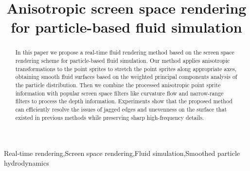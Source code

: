 \documentclass[times,twocolumn,final]{elsarticle}
\begin{document}

\begin{frontmatter}

\title{Anisotropic screen space rendering for particle-based fluid simulation
}%

\author{}



\received{\today}


\begin{abstract}
In this paper we propose a real-time fluid rendering method based on the screen space rendering scheme for particle-based fluid simulation. Our method applies anisotropic transformations to the point sprites to stretch the point sprites along appropriate axes, obtaining smooth fluid surfaces based on the weighted principal components analysis of the particle distribution. Then we combine the processed anisotropic point sprite information with popular screen space filters like curvature flow and narrow-range filters to process the depth information. Experiments show that the proposed method can efficiently resolve the issues of jagged edges and unevenness on the surface that existed in previous methods while preserving sharp high-frequency details.
\end{abstract}

\begin{keyword}
\KWD Real-time rendering\sep Screen space rendering\sep Fluid simulation\sep Smoothed particle hydrodynamics
\end{keyword}

\end{frontmatter}
\end{document}
